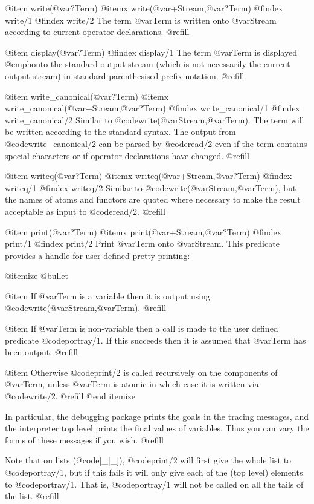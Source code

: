 @item write(@var{?Term})
@itemx write(@var{+Stream},@var{?Term})
@findex write/1
@findex write/2
The term @var{Term} is written onto @var{Stream} according to current
operator declarations. @refill

@item display(@var{?Term})
@findex display/1
The term @var{Term} is displayed @emph{onto the standard output stream}
(which is not necessarily the current output stream) in standard
parenthesised prefix notation. @refill

@item write_canonical(@var{?Term})
@itemx write_canonical(@var{+Stream},@var{?Term})
@findex write_canonical/1
@findex write_canonical/2
Similar to @code{write(@var{Stream},@var{Term})}.  The term will be
written according to the standard syntax.  The output from
@code{write_canonical/2} can be parsed by @code{read/2} even if the term
contains special characters or if operator declarations have changed.
@refill

@item writeq(@var{?Term})
@itemx writeq(@var{+Stream},@var{?Term})
@findex writeq/1
@findex writeq/2
Similar to @code{write(@var{Stream},@var{Term})}, but the names of atoms
and functors are quoted where necessary to make the result acceptable as
input to @code{read/2}. @refill

@item print(@var{?Term})
@itemx print(@var{+Stream},@var{?Term})
@findex print/1
@findex print/2
Print @var{Term} onto @var{Stream}.  This predicate provides a handle
for user defined pretty printing:

@itemize @bullet

@item
If @var{Term} is a variable then it is output using
@code{write(@var{Stream},@var{Term})}. @refill

@item
If @var{Term} is non-variable then a call is made to the user defined
predicate @code{portray/1}.  If this succeeds then it is assumed that
@var{Term} has been output. @refill

@item
Otherwise @code{print/2} is called recursively on the components of
@var{Term}, unless @var{Term} is atomic in which case it is written via
@code{write/2}. @refill
@end itemize

In particular, the debugging package prints the goals in the tracing
messages, and the interpreter top level prints the final values of
variables.  Thus you can vary the forms of these messages if you wish.
@refill

Note that on lists (@code{[_|_]}), @code{print/2} will first give the
whole list to @code{portray/1}, but if this fails it will only give each
of the (top level) elements to @code{portray/1}.  That is,
@code{portray/1} will not be called on all the tails of the list.
@refill

